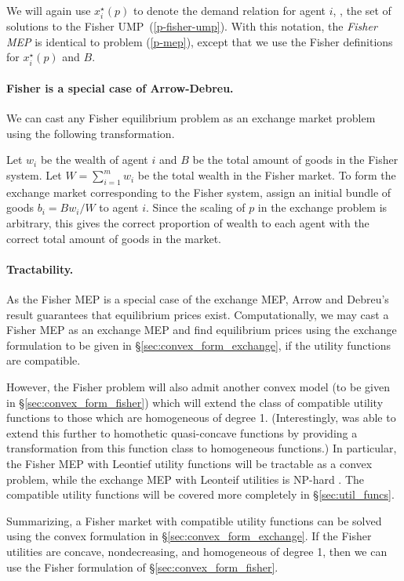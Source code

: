 \documentclass[12pt]{article}
\begin{document}
We will again use $x^\star_i(p)$ to denote the demand relation for agent $i$,
\ie, the set of solutions to the Fisher UMP~(\ref{p-fisher-ump}). With this
notation, the \emph{Fisher MEP} is identical to problem (\ref{p-mep}),
except that we use the Fisher definitions for $x^\star_i(p)$ and $B$.


\paragraph{Fisher is a special case of Arrow-Debreu.}

We can cast any Fisher equilibrium problem as an exchange market problem using
the following transformation.

Let $w_i$ be the wealth of agent $i$ and $B$ be the total amount of goods in
the Fisher system. Let $W = \sum_{i=1}^m w_i$ be the total wealth in the Fisher
market. To form the exchange market corresponding to the Fisher system, assign
an initial bundle of goods $b_i = B w_i/W$ to agent $i$. Since the scaling of
$p$ in the exchange problem is arbitrary, this gives the correct proportion of
wealth to each agent with the correct total amount of goods in the market.


\paragraph{Tractability.}

As the Fisher MEP is a special case of the exchange MEP, Arrow and Debreu's
result guarantees that equilibrium prices exist.
Computationally, we may cast a Fisher MEP as an exchange MEP and find equilibrium
prices using the exchange formulation to be given in
\S\ref{sec:convex_form_exchange}, if the utility functions are compatible.

However, the Fisher problem will also admit another convex model (to be
given in \S\ref{sec:convex_form_fisher}) which will extend the class of
compatible utility functions to those which are homogeneous of degree 1.
(Interestingly, \cite{jain2005market} was able to extend this further
to homothetic quasi-concave functions by providing a transformation
from this function class to homogeneous functions.)
In particular, the Fisher MEP with Leontief utility functions will be tractable
as a convex problem, while the exchange MEP with Leonteif utilities is NP-hard
\cite{codenotti2006leontief}. The compatible utility functions will be covered
more completely in \S\ref{sec:util_funcs}.

Summarizing, a Fisher market with compatible utility functions can be solved
using the convex formulation in \S\ref{sec:convex_form_exchange}. If the Fisher
utilities are concave, nondecreasing, and homogeneous of degree 1, then we can
use the Fisher formulation of \S\ref{sec:convex_form_fisher}.
\end{document}
